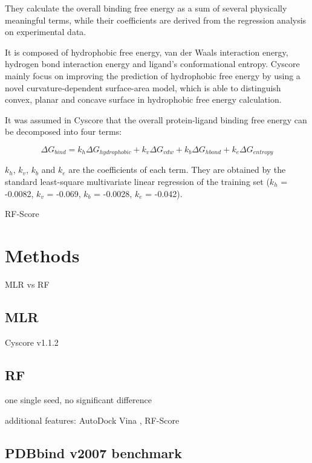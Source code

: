 \documentclass[journal=jacsat,manuscript=article]{achemso}
\begin{document}
They calculate the overall binding free energy as a sum of several physically meaningful terms, while their coefficients are derived from the regression analysis on experimental data.
 
It is composed of hydrophobic free energy, van der Waals interaction energy, hydrogen bond interaction energy and ligand's conformational entropy.
 Cyscore mainly focus on improving the prediction of hydrophobic free energy by using a novel curvature-dependent surface-area model, which is able to distinguish convex, planar and concave surface in hydrophobic free energy calculation. 

It was assumed in Cyscore that the overall protein-ligand binding free energy can be decomposed into four terms:

\begin{equation}
  \Delta G_{bind} = k_h\Delta G_{hydrophobic} + k_v\Delta G_{vdw} + k_b\Delta G_{hbond} + k_e\Delta G_{entropy}
  \label{eqn:example}
\end{equation}

$k_h$, $k_v$, $k_b$ and $k_e$ are the coefficients of each term. They are obtained by the standard least-square multivariate linear regression of the training set ($k_h$ = -0.0082, $k_v$ = -0.069, $k_b$ = -0.0028, $k_e$ = -0.042).

RF-Score \cite{564}

\section{Methods}

MLR vs RF

\subsection{MLR}

Cyscore v1.1.2

\subsection{RF}

one single seed, no significant difference

additional features: AutoDock Vina \cite{595}, RF-Score \cite{564}

\subsection{PDBbind v2007 benchmark}
\end{document}
